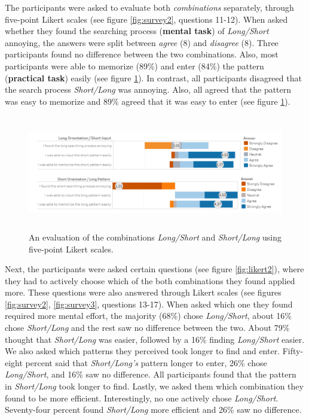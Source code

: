 The participants were asked to evaluate both \textit{combinations} separately, through five-point Likert scales (see figure \ref{fig:survey2}, questions 11-12). When asked whether they found the searching process (\textbf{mental task}) of \textit{Long/Short} annoying, the answers were split between \textit{agree} (8) and \textit{disagree} (8). Three participants found no difference between the two combinations. Also, most participants were able to memorize (89\%) and enter (84\%) the pattern (\textbf{practical task}) easily (see figure \ref{fig:likert}). In contrast, all participants disagreed that the search process \textit{Short/Long} was annoying. Also, all agreed that the pattern was easy to memorize and 89\% agreed that it was easy to enter (see figure \ref{fig:likert}).\\
 
 \begin{figure}[t!]
\centering
\includegraphics[width=15cm, height=5cm]{Chapters/graphics/Likert1213.PNG}
\caption{An evaluation of the combinations \textit{Long/Short} and \textit{Short/Long} using five-point Likert scales. }
\label{fig:likert}
\end{figure}

Next, the participants were asked certain questions (see figure \ref{fig:likert2}), where they had to actively choose which of the both combinations they found applied more. These questions were also answered through Likert scales (see figures \ref{fig:survey2}, \ref{fig:survey3}, questions 13-17). When asked which one they found required more mental effort, the majority (68\%) chose \textit{Long/Short}, about 16\% chose \textit{Short/Long} and the rest saw no difference between the two. 
About 79\% thought that \textit{Short/Long} was easier, followed by a 16\% finding \textit{Long/Short} easier. We also asked which patterns they perceived took longer to find and enter. Fifty-eight percent said that \textit{Short/Long's} pattern longer to enter, 26\% chose \textit{Long/Short}, and 16\% saw no difference. All participants found that the pattern in \textit{Short/Long} took longer to find. Lastly, we asked them which combination they found to be more efficient. Interestingly, no one actively chose \textit{Long/Short}. Seventy-four percent found \textit{Short/Long} more efficient and 26\% saw no difference. \\


